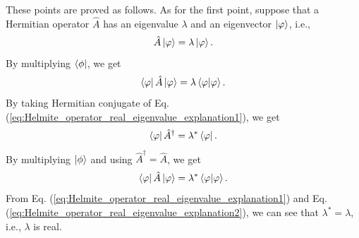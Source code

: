 \documentclass{book}
\begin{document}
These points are proved as follows. As for the first point, suppose that a Hermitian operator $\hat A$ has an eigenvalue $\lambda$ and an eigenvector $\ket \varphi$, i.e.,
\begin{equation}
  \hat A\ket \varphi = \lambda \ket \varphi.
  \label{eq:Helmite_operator_real_eigenvalue_explanation1}
\end{equation}
By multiplying $\bra \phi$, we get
\begin{equation}
  \bra \varphi \hat A \ket \varphi = \lambda \braket{\varphi|\varphi}.
\end{equation}
By taking Hermitian conjugate of Eq. (\ref{eq:Helmite_operator_real_eigenvalue_explanation1}), we get
\begin{equation}
  \bra \varphi \hat A^\dagger = \lambda^* \bra \varphi.
\end{equation}
By multiplying $\ket \phi$ and using $\hat A^\dagger = \hat A$, we get
\begin{equation}
  \bra\varphi \hat A \ket \varphi = \lambda^*\braket{\varphi|\varphi}.
  \label{eq:Helmite_operator_real_eigenvalue_explanation2}
\end{equation}
From Eq. (\ref{eq:Helmite_operator_real_eigenvalue_explanation1}) and Eq. (\ref{eq:Helmite_operator_real_eigenvalue_explanation2}), we can see that $\lambda^* = \lambda$, i.e., $\lambda$ is real. 
\end{document}
